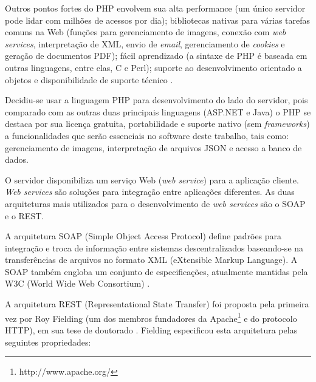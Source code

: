 Outros pontos fortes do PHP envolvem sua alta performance (um único servidor pode lidar com milhões de acessos por dia); bibliotecas nativas para várias tarefas comuns na Web (funções para gerenciamento de imagens, conexão com \textit{web services}, interpretação de XML, envio de \textit{email}, gerenciamento de \textit{cookies} e geração de documentos PDF); fácil aprendizado (a sintaxe de PHP é baseada em outras linguagens, entre elas, C e Perl); suporte ao desenvolvimento orientado a objetos e disponibilidade de suporte técnico \cite{welling2003}. \par

Decidiu-se usar a linguagem PHP para desenvolvimento do lado do servidor, pois comparado com as outras duas principais linguagens (ASP.NET e Java) o PHP se destaca por sua licença gratuita, portabilidade e suporte nativo (sem \textit{frameworks}) a funcionalidades que serão essenciais no software deste trabalho, tais como: gerenciamento de imagens, interpretação de arquivos JSON e acesso a banco de dados. \par

O servidor disponibiliza um serviço Web (\textit{web service}) para a aplicação cliente. \textit{Web services} são soluções para integração entre aplicações diferentes. As duas arquiteturas mais utilizados para o desenvolvimento de \textit{web services} são o SOAP e o REST. 

\par A arquitetura SOAP (Simple Object Access Protocol) define padrões para integração e troca de informação entre sistemas descentralizados baseando-se na transferências de arquivos no formato XML (eXtensible Markup Language). A SOAP também engloba um conjunto de especificações, atualmente mantidas pela W3C (World Wide Web Consortium) \citeyearpar{w3cSOAP}.

\par A arquitetura REST (Representational State Transfer) foi proposta pela primeira vez por Roy Fielding (um dos membros fundadores da Apache\footnote{http://www.apache.org/} e do protocolo HTTP), em sua tese de doutorado \citeyearpar{fielding2000} . Fielding especificou esta arquitetura pelas seguintes propriedades: 

